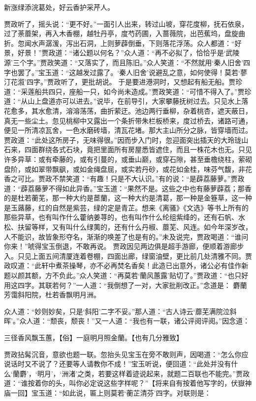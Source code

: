 \documentclass[12pt,oneside]{book}
\begin{document}
新涨绿添浣葛处，好云香护采芹人。

贾政听了，摇头说：“更不好。”一面引人出来，转过山坡，穿花度柳，抚石依泉，过了荼蘼架，再入木香棚，越牡丹亭，度芍药圃，入蔷薇院，出芭蕉坞，盘旋曲折。忽闻水声潺湲，泻出石洞，上则萝薜倒垂，下则落花浮荡。众人都道：“好景，好景！”贾政道：“诸公题以何名？”众人道：“再不必拟了，恰恰乎是‘武陵源’三个字。”贾政笑道：“又落实了，而且陈旧。”众人笑道：“不然就用‘秦人旧舍’四字也罢了。”宝玉道：“这越发过露了。‘秦人旧舍’说避乱之意，如何使得！莫若‘蓼汀花溆’四字。”贾政听了，更批胡说。
于是要进港洞时，又想起有船无船。贾珍道：“采莲船共四只，座船一只，如今尚未造成。”贾政笑道：“可惜不得入了。”贾珍道：“从山上盘道亦可以进去。”说毕，在前导引，大家攀藤抚树过去。只见水上落花愈多，其水愈清，溶溶荡荡，曲折萦迂。池边两行垂柳，杂着桃杏，遮天蔽日，真无一些尘土。忽见桃柳中又露出一个条折带朱栏板桥来，度过桥去，诸路可通，便见一所清凉瓦舍，一色水磨砖墙，清瓦花堵。那大主山所分之脉，皆穿墙而过。
贾政道：“此处这所房子，无味得很。”因而步入门时，忽迎面突出插天的大玲珑山石来，四面群绕各式石块，竟把里面所有房屋悉皆遮住，而且一株花木也无。只见许多异草：或有牵藤的，或有引蔓的，或垂山巅，或穿石隙，甚至垂檐绕柱，萦砌盘阶，或如翠带飘飖，或如金绳盘屈，或实若丹砂，或花如金桂，味芬气馥，非花香之可比。贾政不禁笑道：“有趣！只是不大认识。”有的说：“是薜荔藤萝。”贾政道：“薜荔藤萝不得如此异香。”宝玉道：“果然不是。这些之中也有藤萝薜荔；那香的是杜若蘅芜，那一种大约是茞蘭，这一种大约是清葛，那一种是金簦草，这一种是玉蕗藤，红的自然是紫芸，绿的定是青芷。想来《离骚》《文选》等书上所有的那些异草，也有叫作什么藿纳姜荨的，也有叫作什么纶组紫绛的，还有石帆、水松、扶留等样，又有叫什么绿荑的，还有什么丹椒、蘼芜、风连。如今年深岁改，人不能识，故皆象形夺名，渐渐的唤差了也是有的。”未及说完，贾政喝道：“谁问你来！”唬得宝玉倒退，不敢再说。
贾政因见两边俱是超手游廊，便顺着游廊步入。只见上面五间清厦连着卷棚，四面出廊，绿窗油壁，更比前几处清雅不同。贾政叹道：“此轩中煮茶操琴，亦不必再焚名香矣！此造已出意外，诸公必有佳作新题以颜其额，方不负此。”众人笑道：“再莫若‘蘭风蕙露’贴切了。”贾政道：“也只好用这四字。其联若何？”一人道：“我倒想了一对，大家批削改正。”念道是：
麝蘭芳霭斜阳院，杜若香飘明月洲。

众人道：“妙则妙矣，只是‘斜阳’二字不妥。”那人道：“古人诗云‘蘼芜满院泣斜晖’。”众人道：“颓丧，颓丧！”又一人道：“我也有一联，诸公评阅评阅。”因念道：

三径香风飘玉蕙，【俗】一庭明月照金蘭。【也有几分雅致】

贾政拈髯沉音，意欲也题一联。忽抬头见宝玉在旁不敢则声，因喝道：“怎么你应说话时又不说了？还要等人请教你不成！”宝玉听说，便回道：“此处并没有什么‘蘭麝’，‘明月’，‘洲渚’之类，若要这样着迹说起来，就题二百联也不能完。”贾政道：“谁按着你的头，叫你必定说这些字样呢？”【将来自有按着他写字的，伏嶽神庙一回】宝玉道：“如此说，匾上则莫若‘蘅芷清芬’四字。对联则是：
\end{document}
